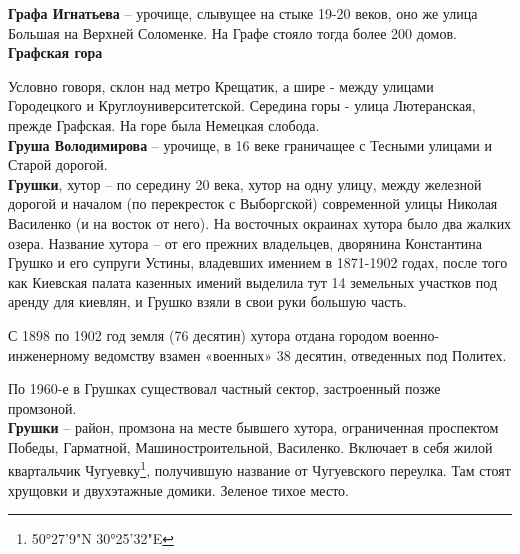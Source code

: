 \textbf{Графа Игнатьева} – урочище, слывущее на стыке 19-20 веков, оно же улица Большая на Верхней Соломенке. На Графе стояло тогда более 200 домов.\\

\textbf{Графская гора} 

Условно говоря, склон над метро Крещатик, а шире - между улицами Городецкого и Круглоуниверситетской. Середина горы - улица Лютеранская, прежде Графская. На горе была Немецкая слобода.\\


\textbf{Груша Володимирова} – урочище, в 16 веке граничащее с Тесными улицами и Старой дорогой.\\

\textbf{Грушки}, хутор – по середину 20 века, хутор на одну улицу, между железной дорогой и началом (по перекресток с Выборгской) современной улицы Николая Василенко (и на восток от него). На восточных окраинах хутора было два жалких озера. Название хутора – от его прежних владельцев, дворянина Константина Грушко и его супруги Устины, владевших имением в 1871-1902 годах, после того как Киевская палата казенных имений выделила тут 14 земельных участков под аренду для киевлян, и Грушко взяли в свои руки большую часть. 

С 1898 по 1902 год земля (76 десятин) хутора отдана городом военно-инженерному ведомству взамен «военных» 38 десятин, отведенных под Политех.

По 1960-е в Грушках существовал частный сектор, застроенный позже промзоной.\\

\textbf{Грушки} – район, промзона на месте бывшего хутора, ограниченная проспектом Победы, Гарматной, Машиностроительной, Василенко. Включает в себя жилой квартальчик Чугуевку\footnote{50°27'9"N   30°25'32"E}, получившую название от Чугуевского переулка. Там стоят хрущовки и двухэтажные домики. Зеленое тихое место.
